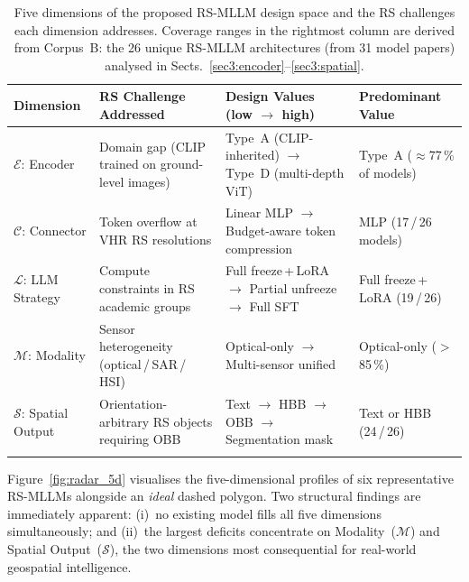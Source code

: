 \begin{table}[h]
\small\setlength\tabcolsep{4pt}
\caption{Five dimensions of the proposed RS-MLLM design space and the RS challenges each
dimension addresses. Coverage ranges in the rightmost column are derived from Corpus~B:
the 26 unique RS-MLLM architectures (from 31 model papers)
analysed in Sects.~\ref{sec3:encoder}--\ref{sec3:spatial}.}\label{tab:dim_motivation}
\begin{tabular*}{\textwidth}{@{\extracolsep\fill}p{2.0cm}p{3.2cm}p{3.8cm}p{3.0cm}}
\toprule
\textbf{Dimension} & \textbf{RS Challenge Addressed} &
\textbf{Design Values (low $\to$ high)} & \textbf{Predominant Value} \\
\midrule
$\mathcal{E}$: Encoder &
Domain gap (CLIP trained on ground-level images) &
Type~A (CLIP-inherited) $\to$ Type~D (multi-depth ViT) &
Type~A ($\approx$77\,\% of models) \\[4pt]

$\mathcal{C}$: Connector &
Token overflow at VHR RS resolutions &
Linear MLP $\to$ Budget-aware token compression &
MLP (17\,/\,26 models) \\[4pt]

$\mathcal{L}$: LLM Strategy &
Compute constraints in RS academic groups &
Full freeze\,+\,LoRA $\to$ Partial unfreeze $\to$ Full SFT &
Full freeze\,+\,LoRA (19\,/\,26) \\[4pt]

$\mathcal{M}$: Modality &
Sensor heterogeneity (optical\,/\,SAR\,/\,HSI) &
Optical-only $\to$ Multi-sensor unified &
Optical-only ($>$85\,\%) \\[4pt]

$\mathcal{S}$: Spatial Output &
Orientation-arbitrary RS objects requiring OBB &
Text $\to$ HBB $\to$ OBB $\to$ Segmentation mask &
Text or HBB (24\,/\,26) \\

\botrule
\end{tabular*}
\end{table}

Figure~\ref{fig:radar_5d} visualises the five-dimensional profiles of six representative
RS-MLLMs alongside an \emph{ideal} dashed polygon. Two structural findings are immediately
apparent: (i)~no existing model fills all five dimensions simultaneously; and (ii)~the
largest deficits concentrate on Modality~($\mathcal{M}$) and Spatial
Output~($\mathcal{S}$), the two dimensions most consequential for real-world geospatial
intelligence.

